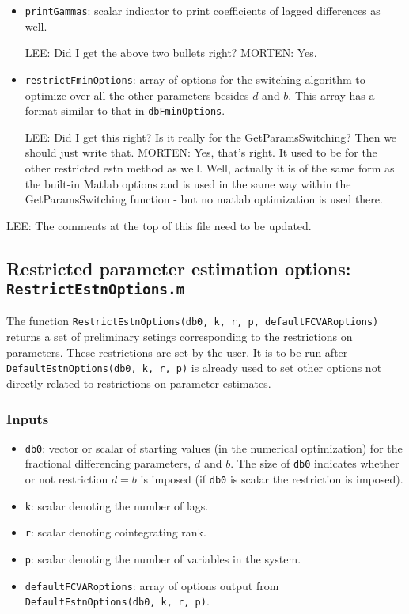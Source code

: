 \documentclass[12pt]{article}
\begin{document}
\begin{itemize}
\item \texttt{printGammas}: scalar indicator to print coefficients of lagged differences as well.

LEE: Did I get the above two bullets right?
MORTEN: Yes.

\item \texttt{restrictFminOptions}: array of options for the switching algorithm to optimize over all the other parameters besides $d$ and $b$. This array has a format similar to that in \texttt{dbFminOptions}.

LEE: Did I get this right? Is it really for the GetParamsSwitching? Then we should just write that.
MORTEN: Yes, that's right. It used to be for the other restricted estn method as well.
Well, actually it is of the same form as the built-in Matlab options and is used in the same way within the GetParamsSwitching function - but no matlab optimization is used there.

\end{itemize}

LEE: The comments at the top of this file need to be updated.



\newpage


\subsection{Restricted parameter estimation options: \texttt{RestrictEstnOptions.m} }

The function \texttt{RestrictEstnOptions(db0, k, r, p, defaultFCVARoptions)} returns a set of preliminary setings corresponding to the restrictions on parameters. These restrictions are set by the user. It is to be run after \texttt{DefaultEstnOptions(db0, k, r, p)} is already used to set other options not directly related to restrictions on parameter estimates.


\subsubsection*{Inputs}

\begin{itemize}

\item  \texttt{db0}: vector or scalar of starting values (in the numerical optimization) for the fractional differencing parameters, $d$ and $b$. The size of \texttt{db0} indicates whether or not restriction $d=b$ is imposed (if \texttt{db0} is scalar the restriction is imposed).

\item \texttt{k}: scalar denoting the number of lags.

\item \texttt{r}: scalar denoting cointegrating rank.

\item \texttt{p}: scalar denoting the number of variables in the system.

\item \texttt{defaultFCVARoptions}: array of options output from \texttt{DefaultEstnOptions(db0, k, r, p)}.

\end{itemize}
\end{document}
